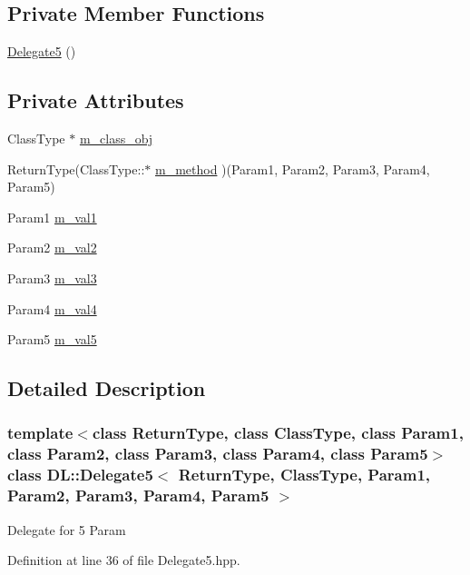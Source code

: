 \subsection*{Private Member Functions}
\begin{CompactItemize}
\item 
\hyperlink{classDL_1_1Delegate5_d0}{Delegate5} ()
\end{CompactItemize}
\subsection*{Private Attributes}
\begin{CompactItemize}
\item 
Class\-Type $\ast$ \hyperlink{classDL_1_1Delegate5_r0}{m\_\-class\_\-obj}
\item 
Return\-Type(Class\-Type::$\ast$ \hyperlink{classDL_1_1Delegate5_r1}{m\_\-method} )(Param1, Param2, Param3, Param4, Param5)
\item 
Param1 \hyperlink{classDL_1_1Delegate5_r2}{m\_\-val1}
\item 
Param2 \hyperlink{classDL_1_1Delegate5_r3}{m\_\-val2}
\item 
Param3 \hyperlink{classDL_1_1Delegate5_r4}{m\_\-val3}
\item 
Param4 \hyperlink{classDL_1_1Delegate5_r5}{m\_\-val4}
\item 
Param5 \hyperlink{classDL_1_1Delegate5_r6}{m\_\-val5}
\end{CompactItemize}


\subsection{Detailed Description}
\subsubsection*{template$<$class Return\-Type, class Class\-Type, class Param1, class Param2, class Param3, class Param4, class Param5$>$ class DL::Delegate5$<$ Return\-Type, Class\-Type, Param1, Param2, Param3, Param4, Param5 $>$}

Delegate for 5 Param



Definition at line 36 of file Delegate5.hpp.

